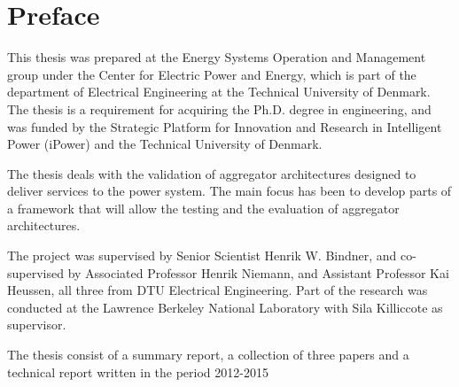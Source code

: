 \chapter{Preface}
This thesis was prepared at the Energy Systems Operation and Management group under the Center for Electric Power and Energy, which is part of the department of Electrical Engineering at the Technical University of Denmark. The thesis is a requirement for acquiring the Ph.D. degree in engineering, and was funded by the Strategic Platform for Innovation and Research in Intelligent Power (iPower) and the Technical University of Denmark.

The thesis deals with the validation of aggregator architectures designed to deliver services to the power system. The main focus has been to develop parts of a framework that will allow the testing and the evaluation of aggregator architectures.

The project was supervised by Senior Scientist Henrik W. Bindner, and co-supervised by Associated Professor Henrik Niemann, and Assistant Professor Kai Heussen, all three from DTU Electrical Engineering. Part of the research was conducted at the Lawrence Berkeley National Laboratory with Sila Killiccote as supervisor.

The thesis consist of a summary report, a collection of three papers and a technical report written in the period 2012-2015
\vfill

{
\centering
\begin{flushright}
    \thesisauthor{}
\end{flushright}
}
